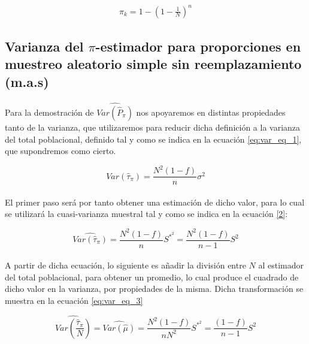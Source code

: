 \documentclass{article}
\begin{document}
      \begin{align}
        \pi_k = 1 - \left(1 - \frac{1}{N}\right)^n
      \end{align}

    \subsection{Varianza del $\pi$-estimador para proporciones en muestreo aleatorio simple sin reemplazamiento (m.a.s)}

      \paragraph{}
      Para la demostración de $\widehat{Var(\widehat{P}_\pi)}$ nos apoyaremos en distintas propiedades tanto de la varianza, que utilizaremos para reducir dicha definición a la varianza del total poblacional, definido tal y como se indica en la ecuación \eqref{eq:var_eq_1}, que supondremos como cierto.

      \begin{equation}
      \label{eq:var_eq_1}
        Var(\widehat{\tau}_\pi) = \frac{N^2(1-f)}{n}\sigma^{2}
      \end{equation}

      \paragraph{}
      El primer paso será por tanto obtener una estimación de dicho valor, para lo cual se utilizará la cuasi-varianza muestral tal y como se indica en la ecuación \eqref{2}:

      \begin{equation}
      \label{eq:var_eq_2}
        \widehat{Var(\widehat{\tau}_\pi)} = \frac{N^2(1-f)}{n}S^{*^{2}} = \frac{N^2(1-f)}{n-1}S^{2}
      \end{equation}

      \paragraph{}
      A partir de dicha ecuación, lo siguiente es añadir la división entre $N$ al estimador del total poblacional, para obtener un promedio, lo cual produce el cuadrado de dicho valor en la varianza, por propiedades de la misma. Dicha transformación se muestra en la ecuación \eqref{eq:var_eq_3}

      \begin{equation}
      \label{eq:var_eq_3}
        \widehat{Var(\frac{\widehat{\tau}_\pi}{N})} = \widehat{Var(\widehat{\mu})} = \frac{N^2(1-f)}{nN^2}S^{*^{2}} = \frac{(1-f)}{n-1}S^{2}
      \end{equation}
\end{document}

